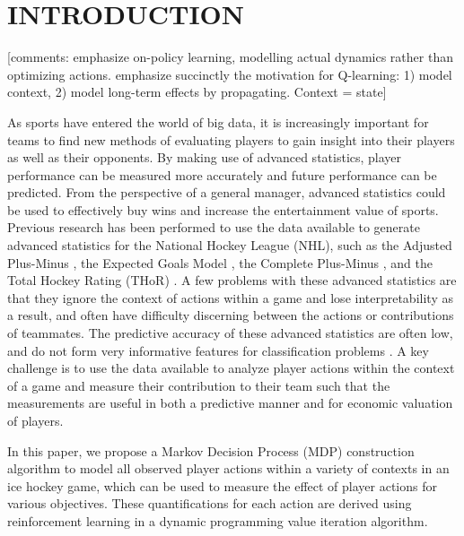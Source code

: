 \documentclass[]{article}
\begin{document}


\section{INTRODUCTION}
[comments: emphasize on-policy learning, modelling actual dynamics rather than optimizing actions. emphasize succinctly the motivation for Q-learning: 1) model context, 2) model long-term effects by propagating. Context = state]

As sports have entered the world of big data, it is increasingly important for teams to find new methods of evaluating players to gain insight into their players as well as their opponents. By making use of advanced statistics, player performance can be measured more accurately and future performance can be predicted. From the perspective of a general manager, advanced statistics could be used to effectively buy wins and increase the entertainment value of sports. Previous research has been performed to use the data available to generate advanced statistics for the National Hockey League (NHL), such as the Adjusted Plus-Minus \citep{Macdonald2011a}, the Expected Goals Model \citep{Macdonald2012}, the Complete Plus-Minus \citep{Spagnola2013}, and the Total Hockey Rating (THoR) \citep{Schuckers2013}. A few problems with these advanced statistics are that they ignore the context of actions within a game and lose interpretability as a result, and often have difficulty discerning between the actions or contributions of teammates. The predictive accuracy of these advanced statistics are often low, and do not form very informative features for classification problems \citep{Weissbock2014}. A key challenge is to use the data available to analyze player actions within the context of a game and measure their contribution to their team such that the measurements are useful in both a predictive manner and for economic valuation of players.

In this paper, we propose a Markov Decision Process (MDP) construction algorithm to model all observed player actions within a variety of contexts in an ice hockey game, which can be used to measure the effect of player actions for various objectives. These quantifications for each action are derived using reinforcement learning in a dynamic programming value iteration algorithm.
\end{document}

